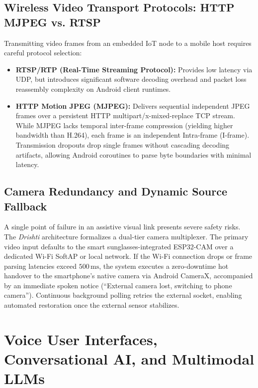 \documentclass[10pt,twocolumn]{article}
\begin{document}
\subsection{Wireless Video Transport Protocols: HTTP MJPEG vs. RTSP}
Transmitting video frames from an embedded IoT node to a mobile host requires careful protocol selection:
\begin{itemize}[leftmargin=*]
    \item \textbf{RTSP/RTP (Real-Time Streaming Protocol):} Provides low latency via UDP, but introduces significant software decoding overhead and packet loss reassembly complexity on Android client runtimes.
    \item \textbf{HTTP Motion JPEG (MJPEG):} Delivers sequential independent JPEG frames over a persistent HTTP multipart/x-mixed-replace TCP stream. While MJPEG lacks temporal inter-frame compression (yielding higher bandwidth than H.264), each frame is an independent Intra-frame (I-frame). Transmission dropouts drop single frames without cascading decoding artifacts, allowing Android coroutines to parse byte boundaries with minimal latency.
\end{itemize}

\subsection{Camera Redundancy and Dynamic Source Fallback}
A single point of failure in an assistive visual link presents severe safety risks. The \textit{Drishti} architecture formalizes a dual-tier camera multiplexer. The primary video input defaults to the smart sunglasses-integrated ESP32-CAM over a dedicated Wi-Fi SoftAP or local network. If the Wi-Fi connection drops or frame parsing latencies exceed $500\,\text{ms}$, the system executes a zero-downtime hot handover to the smartphone's native camera via Android CameraX, accompanied by an immediate spoken notice (``External camera lost, switching to phone camera''). Continuous background polling retries the external socket, enabling automated restoration once the external sensor stabilizes.

\section{Voice User Interfaces, Conversational AI, and Multimodal LLMs}
\label{sec:vui_mllm}
\end{document}
